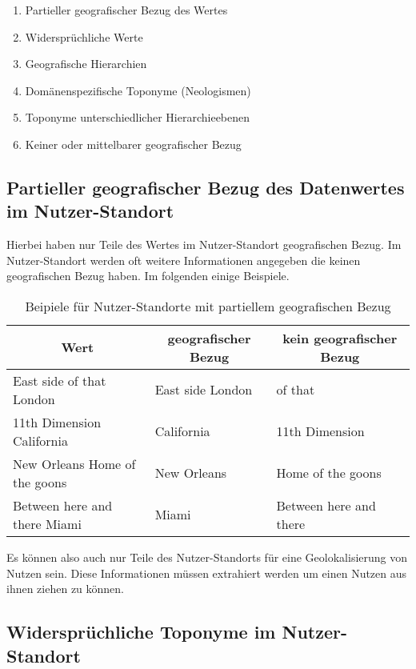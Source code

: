 		\begin{enumerate}	
		 	\item Partieller geografischer Bezug des Wertes
		 	\item Widersprüchliche Werte 
		 	\item Geografische Hierarchien
		 	\item Domänenspezifische Toponyme (Neologismen)
		 	\item Toponyme unterschiedlicher Hierarchieebenen
		 	\item Keiner oder mittelbarer geografischer Bezug
		\end{enumerate}	 

		\subsection{Partieller geografischer Bezug des Datenwertes im Nutzer-Standort} \label{sub:partiellerGeografischerBezug} 

			Hierbei haben nur Teile des Wertes im Nutzer-Standort geografischen Bezug. 
			Im Nutzer-Standort werden oft weitere Informationen angegeben die keinen geografischen Bezug haben. 
			Im folgenden einige Beispiele.

			\begin{table}[h]
				\centering
				\caption{Beipiele für Nutzer-Standorte mit partiellem geografischen Bezug}
				\label{tab:partiellerGeogrBezug}
				\begin{tabular}{|l|l|l|}
				\hline
				\multicolumn{1}{|c|}{Wert} & \multicolumn{1}{c|}{geografischer Bezug} & \multicolumn{1}{c|}{kein geografischer Bezug} \\ \hline
				East side of that London & East side London & of that \\ \hline
				11th Dimension California & California & 11th Dimension \\ \hline
				New Orleans Home of the goons & New Orleans & Home of the goons \\ \hline
				Between here and there Miami & Miami & Between here and there \\ \hline
				\end{tabular}
			\end{table}
			
			Es können also auch nur Teile des Nutzer-Standorts für eine Geolokalisierung von Nutzen sein.
			Diese Informationen müssen extrahiert werden um einen Nutzen aus ihnen ziehen zu können. 

		\subsection{Widersprüchliche Toponyme im Nutzer-Standort} \label{sub:wiederspruechlicheBezuege} 

